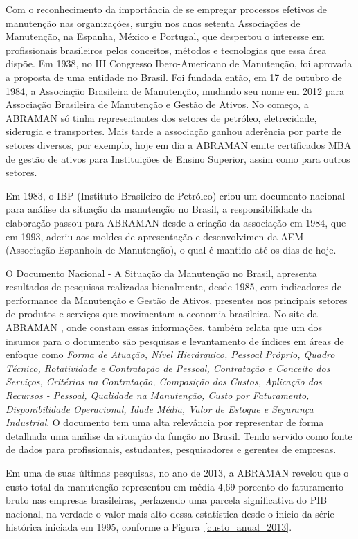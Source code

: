 Com o reconhecimento da importância de se empregar processos efetivos de manutenção nas organizações, surgiu nos anos setenta Associações de Manutenção, na Espanha, México e Portugal, que despertou o interesse em profissionais brasileiros pelos conceitos, métodos e tecnologias que essa área dispõe. Em 1938, no III Congresso Ibero-Americano de Manutenção, foi aprovada a proposta de uma entidade no Brasil. Foi fundada então, em 17 de outubro de 1984, a Associação Brasileira de Manutenção, mudando seu nome em 2012 para Associação Brasileira de Manutenção e Gestão de Ativos. No começo, a ABRAMAN só tinha representantes dos setores de petróleo, eletrecidade, siderugia e transportes. Mais tarde a associação ganhou aderência por parte de setores diversos, por exemplo, hoje em dia a ABRAMAN emite certificados MBA de gestão de ativos para Instituições de Ensino Superior, assim como para outros setores. 

Em 1983, o IBP (Instituto Brasileiro de Petróleo) criou um documento nacional para análise da situação da manutenção no Brasil, a responsibilidade da elaboração passou para ABRAMAN desde a criação da associação em 1984, que em 1993, aderiu aos moldes de apresentação e desenvolvimen da AEM (Associação Espanhola de Manutenção), o qual é mantido até os dias de hoje.  

O Documento Nacional - A Situação da Manutenção no Brasil, apresenta resultados de pesquisas realizadas bienalmente, desde 1985, com indicadores de performance da Manutenção e Gestão de Ativos, presentes nos principais setores de produtos e serviços que movimentam a economia brasileira. No site da ABRAMAN \cite{abraman}, onde constam essas informações, também relata que um dos insumos para o documento são pesquisas e levantamento de índices em áreas de enfoque como \emph{ Forma de Atuação, Nível Hierárquico, Pessoal Próprio, Quadro Técnico, Rotatividade e Contratação de Pessoal, Contratação e Conceito dos Serviços, Critérios na Contratação, Composição dos Custos, Aplicação dos Recursos - Pessoal, Qualidade na Manutenção, Custo por Faturamento, Disponibilidade Operacional, Idade Média, Valor de Estoque e Segurança Industrial}. O documento tem uma alta relevância por representar de forma detalhada uma análise da situação da função no Brasil. Tendo servido como fonte de dados para profissionais, estudantes, pesquisadores e gerentes de empresas.

Em uma de suas últimas pesquisas, no ano de 2013, a ABRAMAN revelou que o custo total da manutenção representou em média 4,69 porcento do faturamento bruto nas empresas brasileiras, perfazendo uma parcela significativa do PIB nacional, na verdade o valor mais alto dessa estatística desde o inicio da série histórica iniciada em 1995, conforme a Figura~\ref{custo_anual_2013}.

